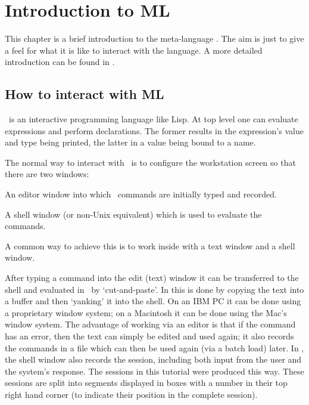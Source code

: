 \chapter{Introduction to ML}
\label{ML}

This chapter is a brief introduction to the meta-language \ML.  The aim is just
to give a feel  for what  it is  like to  interact with  the language.   A more
detailed introduction can be found in \DESCRIPTION.

\section{How to interact with ML}

\ML\ is an interactive programming language like Lisp. At top level one can
evaluate expressions and perform declarations. The former results in the
expression's value and type being printed, the latter in a value being
bound to a name.

The normal way to interact with \ML\ is to configure the workstation screen so that
there are two windows:
\begin{myenumerate}
\item An editor window into which \ML\ commands are initially typed and recorded.
\item A shell window (or non-Unix equivalent) which is used to evaluate the
commands.
\end{myenumerate}

\noindent A common way to achieve this is to work inside  with a text
window and a shell window.

After typing a command into the edit (text) window it can be
transferred to the shell and evaluated in \HOL\ by `cut-and-paste'. In
 this is done by copying the text into a buffer and then
`yanking' it into the shell. On an {\small IBM PC} it can be done
using a proprietary window system; on a Macintosh it can be done using
the Mac's window system. The advantage of working via an editor is
that if the command has an error, then the text can simply be edited
and used again; it also records the commands in a file which can then
be used again (via a batch load) later. In , the shell
window also records the session, including both input from the user
and the system's response. The sessions in this tutorial were produced
this way. These sessions are split into segments displayed in boxes
with a number in their top right hand corner (to indicate their
position in the complete session).

